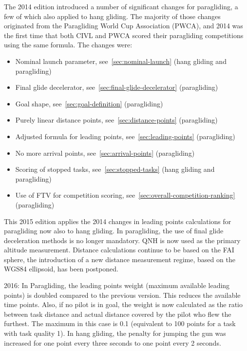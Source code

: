 The 2014 edition introduced a number of significant changes for paragliding,
a few of which also applied to hang gliding. The majority of those changes
originated from the Paragliding World Cup Association (PWCA), and 2014 was the
first time that both CIVL and PWCA scored their paragliding competitions using
the same formula. The changes were:
\begin{itemize}
    \item
        Nominal launch parameter, see~\ref{sec:nominal-launch} (hang gliding
        and paragliding)
    \item
        Final glide decelerator, see~\ref{sec:final-glide-decelerator}
        (paragliding)
    \item
        Goal shape, see~\ref{sec:goal-definition} (paragliding)
    \item
        Purely linear distance points, see~\ref{sec:distance-points}
        (paragliding)
    \item
        Adjusted formula for leading points, see~\ref{sec:leading-points}
        (paragliding)
    \item
        No more arrival points, see~\ref{sec:arrival-points} (paragliding)
    \item
        Scoring of stopped tasks, see~\ref{sec:stopped-tasks} (hang gliding and
        paragliding)
    \item
        Use of FTV for competition scoring,
        see~\ref{sec:overall-competition-ranking} (paragliding)
\end{itemize}
This 2015 edition applies the 2014 changes in leading points calculations for
paragliding now also to hang gliding. In paragliding, the use of final glide
deceleration methods is no longer mandatory. QNH is now used as the primary
altitude measurement. Distance calculations continue to be based on the FAI
sphere, the introduction of a new distance measurement regime, based on the
WGS84 ellipsoid, has been postponed.

2016: In Paragliding, the leading points weight (maximum available leading
points) is doubled compared to the previous version. This reduces the available
time points. Also, if no pilot is in goal, the weight is now calculated as the
ratio between task distance and actual distance covered by the pilot who flew
the furthest. The maximum in this case is 0.1 (equivalent to 100 points for
a task with task quality 1). In hang gliding, the penalty for jumping the gun
was increased for one point every three seconds to one point every 2 seconds.

